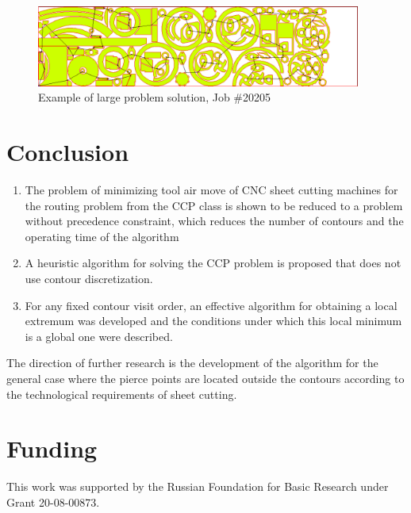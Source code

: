 \documentclass[]{llncs}
\begin{document}
\begin{figure}
  \begin{center}
    \includegraphics[width=0.95\textwidth]{test5-ccp.png}
  \end{center}
  \caption{Example of large problem solution, Job \#20205}
  \label{large-path}
\end{figure}

\section{Conclusion}

\begin{enumerate}
  \item
  The problem of minimizing tool air move of CNC sheet cutting machines
  for the routing problem from the CCP class
  is shown to be reduced
  to a problem without precedence constraint,
  which reduces the number of contours and the operating time of the algorithm
  \item
  A heuristic algorithm for solving the CCP problem is proposed that does not use contour discretization.
  \item
  For any fixed contour visit order,
  an effective algorithm for obtaining a local extremum was developed
  and the conditions under which
  this local minimum is a global one
  were described.
\end{enumerate}

The direction of further research is the development of the algorithm
for the general case where the pierce points
are located
outside the contours
according to the technological requirements of sheet cutting.

\section*{Funding}

This work was supported by the
Russian Foundation for Basic Research
under Grant
20-08-00873.



\end{document}
